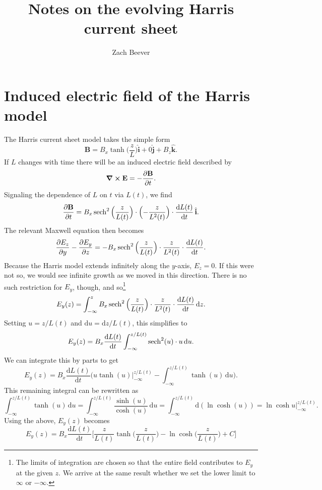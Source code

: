 \documentclass{article}
\author{Zach Beever}
\title{Notes on the evolving Harris current sheet}
\date{}
\begin{document}
	\maketitle
	
	\section{Induced electric field of the Harris model}
	
	The Harris current sheet model takes the simple form
	\[
		\mathbf{B} = B_x\tanh\Big(\frac{z}{L}\Big)\hat{\mathbf{i}} + 0\hat{\mathbf{j}} + B_z\hat{\mathbf{k}}.
	\]
	If $L$ changes with time there will be an induced electric field described by 
	\[
		\curl{\mathbf{E}} = -\frac{\partial\mathbf{B}}{\partial t}.
	\]
	Signaling the dependence of $L$ on $t$ via $L(t)$, we find
	\[
		\frac{\partial\mathbf{B}}{\partial t} = B_x\sech^2\Big(\frac{z}{L(t)}\Big)\cdot\Big({-\frac{z}{L^2(t)}}\Big)\cdot\frac{\mathrm{d}L(t)}{\mathrm{d}t}\,\hat{\mathbf{i}}.
	\]
	The relevant Maxwell equation then becomes
	\[
		\frac{\partial E_z}{\partial y} - \frac{\partial E_y}{\partial z} = -B_x\sech^2\Big(\frac{z}{L(t)}\Big)\cdot\frac{z}{L^2(t)}\cdot\frac{\mathrm{d}L(t)}{\mathrm{d}t}.
	\]
	Because the Harris model extends infinitely along the $y$-axis, $E_z = 0$. If this were not so, we would see infinite growth as we moved in this direction. There is no such restriction for $E_y$, though, and so\footnote{The limits of integration are chosen so that the entire field contributes to $E_y$ at the given $z$. We arrive at the same result whether we set the lower limit to $\infty$ or $-\infty$.}
	\[
		E_y(z) = \int_{-\infty}^z B_x\sech^2\Big(\frac{z}{L(t)}\Big)\cdot\frac{z}{L^2(t)}\cdot\frac{\mathrm{d}L(t)}{\mathrm{d}t}\,\mathrm{d}z.
	\]
	Setting $u = z/L(t)$ and $\mathrm{d}u = \mathrm{d}z/L(t)$, this simplifies to
	\[
		E_y(z) = B_x\frac{\mathrm{d}L(t)}{\mathrm{d}t}\int_{-\infty}^{z/L(t)}\sech^2(u)\cdot u\,\mathrm{d}u.
	\]
	We can integrate this by parts to get
	\[
		E_y(z) = B_x\frac{\mathrm{d}L(t)}{\mathrm{d}t}\Big(u\tanh(u)\Big|_{-\infty}^{z/L(t)} - \int_{-\infty}^{z/L(t)}\tanh(u)\,\mathrm{d}u\Big).
	\]
	This remaining integral can be rewritten as
	\[
		\int_{-\infty}^{z/L(t)}\tanh(u)\,\mathrm{d}u = \int_{-\infty}^{z/L(t)}\frac{\sinh(u)}{\cosh(u)}\,\mathrm{d}u = \int_{-\infty}^{z/L(t)}\mathrm{d}(\ln{\cosh(u)}) = \ln\cosh u\Big|_{-\infty}^{z/L(t)}.
	\]
	Using the above, $E_y(z)$ becomes
	\[
		E_y(z) = B_x\frac{\mathrm{d}L(t)}{\mathrm{d}t}\Big[\frac{z}{L(t)}\tanh\Big(\frac{z}{L(t)}\Big)- \ln\cosh\Big(\frac{z}{L(t)} \Big) + C\Big]
	\]
\end{document}
